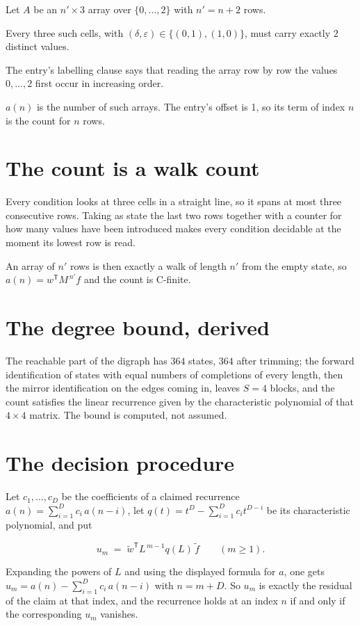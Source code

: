\documentclass[11pt]{article}
\theoremstyle{definition}
\begin{document}
Let $A$ be an $n' \times 3$ array over $\{0,\dots,2\}$ with $n' = n + 2$ rows.

Every three such cells, with $(\delta,\varepsilon) \in \{(0,1), (1,0)\}$, must carry exactly $2$ distinct values.

The entry's labelling clause says that reading the array row by row the values $0,\dots,2$ first occur in increasing order.

$a(n)$ is the number of such arrays. The entry's offset is 1, so its term of index $n$ is the count for $n$ rows.

\section{The count is a walk count}

Every condition looks at three cells in a straight line, so it spans at most three consecutive rows. Taking as state the last two rows together with a counter for how many values have been introduced makes every condition decidable at the moment its lowest row is read.

An array of $n'$ rows is then exactly a walk of length $n'$ from the empty state, so $a(n) = w^{\mathsf T}M^{\,n'}f$ and the count is C-finite.

\section{The degree bound, derived}

The reachable part of the digraph has $364$ states, $364$ after trimming; the forward identification of states with equal numbers of completions of every length, then the mirror identification on the edges coming in, leaves $S = 4$ blocks, and the count satisfies the linear recurrence given by the characteristic polynomial of that $4\times4$ matrix. The bound is computed, not assumed.

\section{The decision procedure}

Let $c_1,\dots,c_D$ be the coefficients of a claimed recurrence $a(n) = \sum_{i=1}^{D} c_i\,a(n-i)$, let $q(t) = t^{D} - \sum_{i=1}^{D} c_i t^{D-i}$ be its characteristic polynomial, and put

\[u_m \;=\; \tilde w^{\mathsf T} L^{\,m-1} q(L)\,\tilde f \qquad (m \ge 1).\]

Expanding the powers of $L$ and using the displayed formula for $a$, one gets $u_m = a(n) - \sum_{i=1}^{D} c_i\,a(n-i)$ with $n = m + D$. So $u_m$ is exactly the residual of the claim at that index, and the recurrence holds at an index $n$ if and only if the corresponding $u_m$ vanishes.
\end{document}

